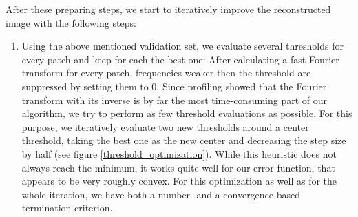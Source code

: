 \documentclass[10pt,conference,compsocconf]{IEEEtran}
\begin{document}
After these preparing steps, we start to iteratively improve the reconstructed image with the following steps:
\begin{enumerate}
\item Using the above mentioned validation set, we evaluate several thresholds for every patch and keep for each the best one:
After calculating a fast Fourier transform for every patch, frequencies weaker then the threshold are suppressed by setting them to 0.
Since profiling showed that the Fourier transform with its inverse is by far the most time-consuming part of our algorithm, we try to
perform as few threshold evaluations as possible.
For this purpose, we iteratively evaluate two new thresholds around a center threshold, taking the best one as the new center and
decreasing the step size by half (see figure \ref{threshold_optimization}). While this heuristic does not always reach the minimum,
it works quite well for our error function, that appears to be very roughly convex.
For this optimization as well as for the whole iteration, we have both a number- and a convergence-based termination criterion.


\end{enumerate}
\end{document}
